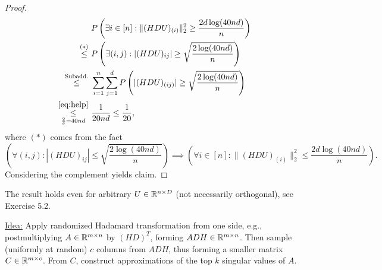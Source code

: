\begin{lemma}
\begin{proof}
\begin{equation*}
\begin{split}
& P\left(
\exists i \in [n]: \|(HDU)_{(i)}\|_2^2 \geq \frac{2d\log(40nd)}{n}
\right) \\
\overset{(*)}{\leq} \ & P \left(
\exists (i,j): \left|
(HDU)_{ij}%
\right| \geq \sqrt{\frac{2\log(40nd)}{n}}
\right) \\
\overset{\text{Subadd.}}{\leq} \ &
\sum_{i=1}^n \sum_{j=1}^d P\left( |(HDU)_{(ij)}| \geq \sqrt{\frac{2\log(40nd)}{n}}
\right) \\
\underset{\frac{2}{\delta}=40nd}{\overset{\eqref{eq:help}}{\leq}} \ &\frac{1}{20nd} \leq \frac{1}{20},
\end{split}
\end{equation*}
where $(*)$ comes from the fact 
\begin{equation*}
\left(
\forall (i,j): \left|
(HDU)_{ij}%
\right| \leq \sqrt{\frac{2\log(40nd)}{n}}
\right)  \implies \left(
\forall i \in [n]: \|(HDU)_{(i)}\|_2^2 \leq \frac{2d\log(40nd)}{n}
\right).
\end{equation*}
Considering the complement yields claim.
\end{proof}
\begin{remark*}
The result holds even for arbitrary $U\in \mathbb{R}^{n\times D}$ (not necessarily orthogonal), see Exercise 5.2.
\end{remark*}
\end{lemma}
\underline{Idea:} Apply randomized Hadamard transformation from one side, e.g., postmultiplying $A\in\mathbb{R}^{m\times n}$ by $(HD)^T$, forming $ADH\in \mathbb{R}^{m \times n}$. Then sample (uniformly at random) $c$ columns from $ADH$, thus forming a smaller matrix $C\in\mathbb{R}^{m\times c}$. From $C$, construct approximations of the top $k$ singular values of $A$.\\

